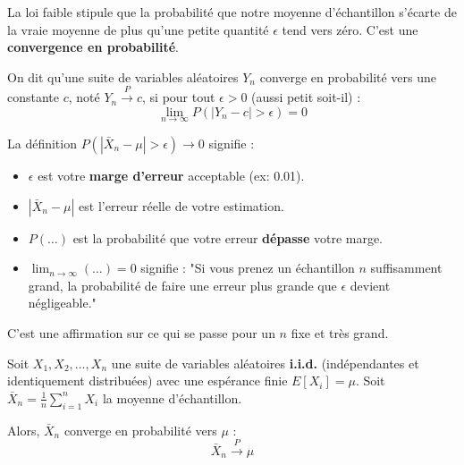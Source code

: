La loi faible stipule que la probabilité que notre moyenne d'échantillon s'écarte de la vraie moyenne de plus qu'une petite quantité $\epsilon$ tend vers zéro. C'est une \textbf{convergence en probabilité}.

\begin{definitionbox}
On dit qu'une suite de variables aléatoires $Y_n$ converge en probabilité vers une constante $c$, noté $Y_n \xrightarrow{P} c$, si pour tout $\epsilon > 0$ (aussi petit soit-il) :
$$\lim_{n \to \infty} P(|Y_n - c| > \epsilon) = 0$$
\end{definitionbox}

\begin{intuitionbox}
La définition $P(|\bar{X}_n - \mu| > \epsilon) \to 0$ signifie :
\begin{itemize}
    \item $\epsilon$ est votre \textbf{marge d'erreur} acceptable (ex: 0.01).
    \item $|\bar{X}_n - \mu|$ est l'erreur réelle de votre estimation.
    \item $P(\dots)$ est la probabilité que votre erreur \textbf{dépasse} votre marge.
    \item $\lim_{n \to \infty} (\dots) = 0$ signifie : "Si vous prenez un échantillon $n$ suffisamment grand, la probabilité de faire une erreur plus grande que $\epsilon$ devient négligeable."
\end{itemize}
C'est une affirmation sur ce qui se passe pour un $n$ fixe et très grand.
\end{intuitionbox}

\begin{theorembox}
Soit $X_1, X_2, \dots, X_n$ une suite de variables aléatoires \textbf{i.i.d.} (indépendantes et identiquement distribuées) avec une espérance finie $E[X_i] = \mu$.
Soit $\bar{X}_n = \frac{1}{n} \sum_{i=1}^n X_i$ la moyenne d'échantillon.

Alors, $\bar{X}_n$ converge en probabilité vers $\mu$ :
$$\bar{X}_n \xrightarrow{P} \mu$$
\end{theorembox}

